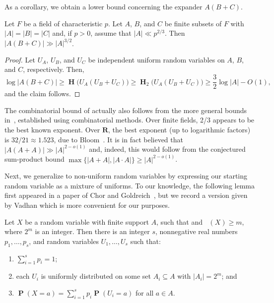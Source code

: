 \documentclass[twoside, 10pt]{article}
\DeclareMathOperator{\Eta}{\mathbf{H}}
\DeclareMathOperator{\Etamin}{\mathbf{H}_\infty}
\DeclareMathOperator{\pr}{\mathbf{P}}
\newcommand{\RR}{\mathbf{R}}   %
\begin{document}
As a corollary, we obtain a lower bound concerning the expander $A(B+C)$.

\begin{corollary} 
\label{cor:ABC}
Let $F$ be a field of characteristic $p$.
Let $A$, $B$, and $C$ be finite subsets of $F$ with $|A|=|B|=|C|$
and, if $p>0$, assume that $|A|\ll p^{2/3}$. Then
$\bigl| A(B+C)\bigr| \gg |A|^{3/2}$.
\end{corollary}

\begin{proof}
Let $U_A$, $U_B$, and $U_C$ be independent uniform random variables on $A$, $B$, and $C$, respectively. Then,
$$\log\bigl| A(B+C)\bigr| \ge \Eta\bigl( U_A(U_B+U_C) \bigr)
\ge \Eta_2\bigl( U_A(U_B+U_C)\bigr) \ge \frac32 \log |A| - O(1),$$
and the claim follows.
\end{proof}

The combinatorial bound of  actually also 
follows from the more general bounds 
in~\cite[Corollary~20]{yazicietal2017},
established using combinatorial methods.
Over finite fields, 2/3 appears to be the best known exponent.
Over $\RR$, the best exponent (up to logarithmic factors)
is $32/21\approx 1.523$, 
due to Bloom~\cite{bloom2025}. 
It is in fact believed that $\bigl|A(A+A)\bigr| \gg |A|^{2-o(1)}$ and,
indeed, this would follow from the conjectured sum-product 
bound $\max\bigl\{ |A+A|, |A\cdot A|\bigr\} \ge |A|^{2-o(1)}$.

Next, we generalize  to non-uniform random variables by expressing our starting random variable as a mixture of uniforms. To our knowledge, the following lemma first appeared in a paper of
Chor and Goldreich~\cite[Lemma 5]{CG88}, but we record a version given by Vadhan which is more convenient for our purposes.

\begin{lemma}
\label{lemconvexcomb}
Let $X$ be a random variable with finite support $A$,
such that and $\Etamin(X) \ge m$, where $2^m$ is an integer. 
Then there is an integer $s$, nonnegative real numbers $p_1,\ldots,p_s$, 
and random variables $U_1,\ldots,U_s$ such that:
\begin{enumerate}
\item $\sum_{i=1}^s p_i = 1$;
\item each $U_i$ is uniformly distributed on some set $A_i\subseteq A$ with $|A_i| = 2^m$; and
\item $\pr(X=a) = \sum_{i=1}^s p_i \pr(U_i = a)$ for all $a\in A$.
\end{enumerate}
\end{lemma}
\end{document}
